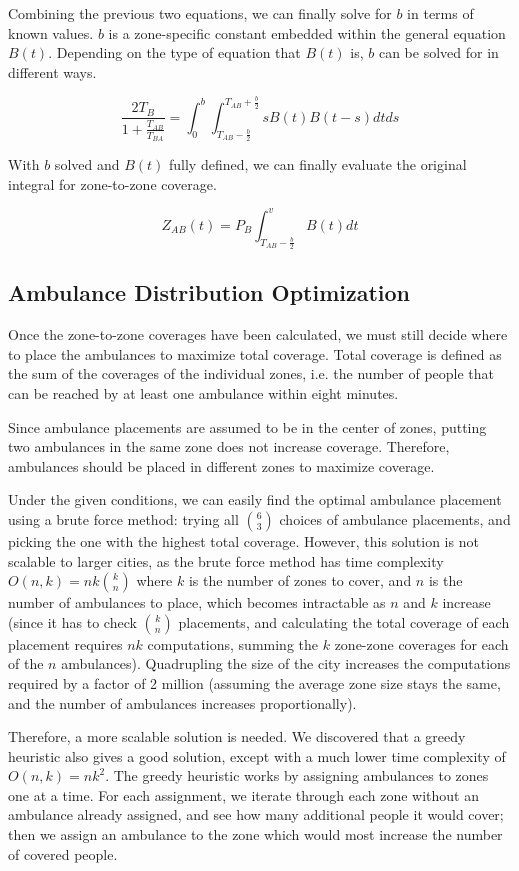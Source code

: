 \documentclass[notitlepage, 12pt]{article}
\begin{document}
Combining the previous two equations, we can finally solve for $b$ in terms of known values. $b$ is a zone-specific constant embedded within the general equation $B(t)$. Depending on the type of equation that $B(t)$ is, $b$ can be solved for in different ways.

$$\frac {2T_B}{1+ \frac{T_{AB}}{T_{BA}}} = \int^b_0 \int^{T_{AB} + \frac{b}{2}}_{T_{AB} - \frac{b}{2}} s B(t) B(t-s) dt ds$$

With $b$ solved and $B(t)$ fully defined, we can finally evaluate the original integral for zone-to-zone coverage.

$$Z_{AB}(t) = P_B \int^v_{T_{AB} - \frac{b}{2}} B(t) dt$$

\subsection{Ambulance Distribution Optimization}
Once the zone-to-zone coverages have been calculated, we must still decide where to place
the ambulances to maximize total coverage. Total coverage is defined as the sum of the coverages
of the individual zones, i.e. the number of people that can be reached by at least one ambulance
within eight minutes.

Since ambulance placements are assumed to be in the center of zones, putting two ambulances in the same
zone does not increase coverage. Therefore, ambulances should be placed in different zones to maximize
coverage.

Under the given conditions, we can easily find the optimal ambulance placement using a brute force
method: trying all $\binom{6}{3}$ choices of ambulance placements, and picking the one with the highest total coverage.
However, this solution is not scalable to larger cities, as the brute force method has time complexity
$O(n, k) = nk\binom{k}{n}$ where $k$ is the number of zones to cover, and $n$ is the number of ambulances to place, which
becomes intractable as $n$ and $k$ increase (since it has to check $\binom{k}{n}$ placements,
and calculating the total coverage of each placement requires $nk$ computations, summing the $k$ zone-zone
coverages for each of the $n$ ambulances). Quadrupling the size of the city
increases the computations required by a factor of 2 million (assuming the average zone size stays the same,
and the number of ambulances increases proportionally).

Therefore, a more scalable solution is needed. We discovered that a greedy heuristic also gives a good solution,
except with a much lower time complexity of $O(n, k) = n k^2$. The greedy heuristic works by assigning ambulances to zones
one at a time. For each assignment, we iterate through each zone without an ambulance already assigned, and see how many
additional people it would cover; then we assign an ambulance to the zone which would most increase the number of
covered people.
\end{document}
